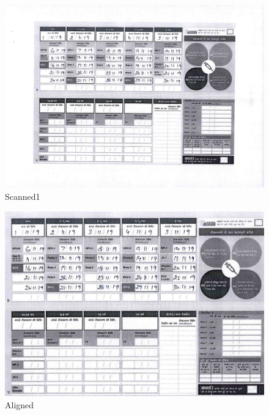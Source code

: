 \documentclass{article}
\begin{document}
\pagebreak
    \begin{figure}[!htb]
    \minipage{\textwidth}
    \begin{center}
      \includegraphics[scale=.25]{4/.report/_orig/s1.jpg}
      \caption{Scanned1}
    \end{center}
    \endminipage
    \end{figure}
    \begin{figure}[!htb]
    \minipage{\textwidth}
    \begin{center}
      \includegraphics[scale=.2]{4/.report/_aligned/s1.jpg}
      \caption{Aligned}
    \end{center}
    \endminipage
    \end{figure}
\end{document}
